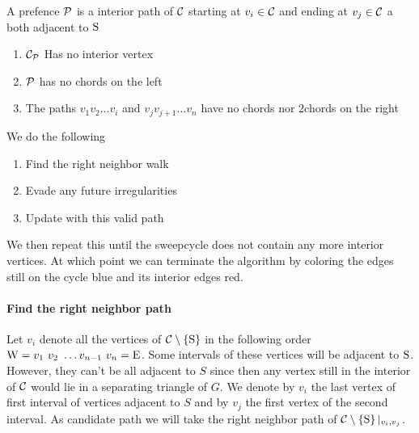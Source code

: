   \begin{defi}[Prefence]
    A prefence $\P$ is a interior path of $\C$ starting at $v_i \in \C$ and ending at $v_j \in \C$ a both adjacent to $\pS$
    \begin{enumerate}
      \itemsep=-4pt
      \renewcommand*{\labelenumi}{(P\arabic{enumi})}%
      \renewcommand*{\theenumi}{(P\arabic{enumi})}%

      \item  $\C_\P$ Has no interior vertex
      \label{p:noInteriorVertex}
      \item  $\P$ has no chords on the left     \label{p:Wchordfree}
      \item  The paths $v_1 v_2 \ldots v_i$ and $v_j v_{j+1} \ldots v_n$ have no chords nor 2chords on the right     \label{p:Cchordfree}
    \end{enumerate}
  \end{defi}

  We do the following
  \begin{enumerate}
    \itemsep=-4pt
    \item Find the right neighbor walk
    \item Evade any future irregularities
    \item Update with this valid path
  \end{enumerate}

  We then repeat this until the sweepcycle does not contain any more interior vertices. At which point we can terminate the algorithm by coloring the edges still on the cycle blue and its interior edges red.

  \paragraph{Find the right neighbor path}
    Let $v_i$ denote all the vertices of $\cpath$ in the following order $\pW =  v_1 \  v_2 \  \ldots v_{n-1} \  v_n = \pE$.
    Some intervals of these vertices will be adjacent to $\pS$. However, they can't be all adjacent to $S$ since then any vertex still in the interior of $\C$ would lie in a separating triangle of $G$. We denote by $v_i$ the last vertex of first interval of vertices adjacent to $S$ and by $v_j$ the first vertex of the second interval.
    As candidate path we will take the right neighbor path of $\cpath|_{v_i, v_j}$.

